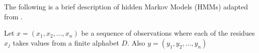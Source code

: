 The following is a brief description of hidden Markov Models (HMMs) adapted from \cite{mesa2016hidden}.

Let $x = (x_1,x_2,\ldots,x_n)$ be a sequence of observations where each of the residues $x_j$ takes values from a finite alphabet $D$. 
Also $y = (y_1,y_2,\ldots,y_n)$ 
